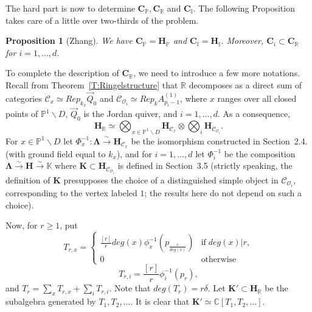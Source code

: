 \documentclass[a4paper,10pt]{amsart}
\def\H{\mathbf{H}}
\def\C{\mathbb{C}}
\def\LLambda{\boldsymbol{\Lambda}}
\newtheorem{prop}[theo]{Proposition}
\numberwithin{equation}{section}
\begin{document}
\vspace{.15in}

The hard part is now to determine $\mathbf{C}_{\mathbb{P}}, \mathbf{C}_{\mathbb{R}}$ and $\mathbf{C}_{\mathbb{I}}$. The following Proposition takes care of a little over two-thirds of the problem.

\vspace{.15in}

\begin{prop}[Zhang] We have $\mathbf{C}_{\mathbb{P}}=\H_{\mathbb{P}}$ and $\mathbf{C}_{\mathbb{I}}=\H_{\mathbb{I}}$. Moreover, $\mathbf{C}_i \subset \mathbf{C}_{\mathbb{R}}$ for $i=1, \ldots, d$.\end{prop}

\vspace{.15in}

To complete the description of $\mathbf{C}_{\mathbb{R}}$, we need to introduce a few more notations.
Recall from Theorem~\ref{T:Ringelstructure} that $\mathbb{R}$ decomposes as a direct sum of categories $\mathcal{C}_x \simeq Rep_{k_x}\vec{Q}_0$ and $\mathcal{C}_{\mathcal{O}_i} \simeq Rep_k A_{p_i-1}^{(1)}$, where $x$ ranges over all closed points of $\mathbb{P}^1\backslash D$, $\vec{Q}_0$ is the Jordan quiver, and $i=1, \ldots, d$. As a consequence,
$$\H_{\mathbb{R}}\simeq \bigotimes_{x \in \mathbb{P}^1 \backslash D} \H_{\mathcal{C}_x} \otimes \bigotimes_i \H_{\mathcal{C}_{\mathcal{O}_i}}.$$
For $x \in \mathbb{P}^1 \backslash D$ let $\Phi_x^{-1}: \LLambda \stackrel{\sim}{\to} \H_{\mathcal{C}_x}$ be the isomorphism constructed in Section~2.4. (with ground field equal to $k_x$), and for $i=1, \ldots, d$ let $\Phi_i^{-1}$ be the composition $\LLambda \stackrel{\sim}{\to}\H \stackrel{\sim}{\to} \mathbb{K}$ where $\mathbf{K} \subset \H_{\mathcal{C}_{\mathcal{O}_i}}$ is defined in Section~3.5 (strictly speaking, the definition of $\mathbf{K}$ presupposes the choice of a distinguished simple object in $\mathcal{C}_{\mathcal{O}_i}$, corresponding to the vertex labeled $1$; the results here do not depend on such a choice).

Now, for $r \geq 1$, put
$$T_{r,x}=\begin{cases} \frac{[r]}{r}deg(x) \phi_x^{-1}(p_{\frac{r}{deg(x)}})& \text{if}\; deg(x) | r,\\
0& \text{otherwise}\end{cases}$$
$$T_{r,i}=\frac{[r]}{r}\phi_i^{-1}(p_r),$$
and $T_r=\sum_x T_{r,x}+\sum_i T_{r,i}$. Note that $deg(T_r)=r\delta$. Let $\mathbf{K}' \subset \H_{\mathbb{R}}$ be the subalgebra generated by $T_1, T_2, \ldots$. It is clear that $\mathbf{K}'\simeq \C[T_1, T_2, \ldots]$.
\end{document}
